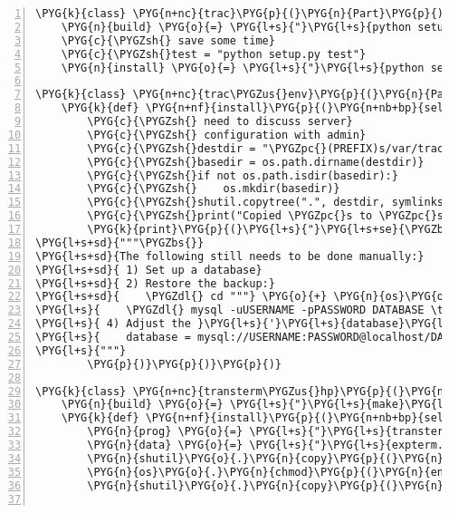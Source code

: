 \begin{Verbatim}[commandchars=\\\{\},numbers=left,firstnumber=1,stepnumber=5]
\PYG{k}{class} \PYG{n+nc}{trac}\PYG{p}{(}\PYG{n}{Part}\PYG{p}{)}\PYG{p}{:}
    \PYG{n}{build} \PYG{o}{=} \PYG{l+s}{"}\PYG{l+s}{python setup.py build}\PYG{l+s}{"}
    \PYG{c}{\PYGZsh{} save some time}
    \PYG{c}{\PYGZsh{}test = "python setup.py test"}
    \PYG{n}{install} \PYG{o}{=} \PYG{l+s}{"}\PYG{l+s}{python setup.py install --prefix=\PYGZdl{}PREFIX}\PYG{l+s}{"}

\PYG{k}{class} \PYG{n+nc}{trac\PYGZus{}env}\PYG{p}{(}\PYG{n}{Part}\PYG{p}{)}\PYG{p}{:}
    \PYG{k}{def} \PYG{n+nf}{install}\PYG{p}{(}\PYG{n+nb+bp}{self}\PYG{p}{)}\PYG{p}{:}
        \PYG{c}{\PYGZsh{} need to discuss server}
        \PYG{c}{\PYGZsh{} configuration with admin}
        \PYG{c}{\PYGZsh{}destdir = "\PYGZpc{}(PREFIX)s/var/trac\PYGZus{}env" \PYGZpc{} env}
        \PYG{c}{\PYGZsh{}basedir = os.path.dirname(destdir)}
        \PYG{c}{\PYGZsh{}if not os.path.isdir(basedir):}
        \PYG{c}{\PYGZsh{}    os.mkdir(basedir)}
        \PYG{c}{\PYGZsh{}shutil.copytree(".", destdir, symlinks=True)}
        \PYG{c}{\PYGZsh{}print("Copied \PYGZpc{}s to \PYGZpc{}s\PYGZbs{}n" \PYGZpc{} (os.getcwd(), destdir))}
        \PYG{k}{print}\PYG{p}{(}\PYG{l+s}{"}\PYG{l+s+se}{\PYGZbs{}n}\PYG{l+s}{"}\PYG{o}{.}\PYG{n}{join}\PYG{p}{(}\PYG{p}{(}
\PYG{l+s+sd}{"""\PYGZbs{}}
\PYG{l+s+sd}{The following still needs to be done manually:}
\PYG{l+s+sd}{ 1) Set up a database}
\PYG{l+s+sd}{ 2) Restore the backup:}
\PYG{l+s+sd}{    \PYGZdl{} cd """} \PYG{o}{+} \PYG{n}{os}\PYG{o}{.}\PYG{n}{getcwd}\PYG{p}{(}\PYG{p}{)} \PYG{o}{+} \PYG{l+s}{"""}
\PYG{l+s}{    \PYGZdl{} mysql -uUSERNAME -pPASSWORD DATABASE \textless{} mysql-db-backup.sql}
\PYG{l+s}{ 4) Adjust the }\PYG{l+s}{'}\PYG{l+s}{database}\PYG{l+s}{'}\PYG{l+s}{ variable in the [trac] section in }\PYG{l+s}{'}\PYG{l+s}{conf/trac.ini}\PYG{l+s}{'}\PYG{l+s}{:}
\PYG{l+s}{    database = mysql://USERNAME:PASSWORD@localhost/DATABSE}
\PYG{l+s}{"""}
        \PYG{p}{)}\PYG{p}{)}\PYG{p}{)}

\PYG{k}{class} \PYG{n+nc}{transterm\PYGZus{}hp}\PYG{p}{(}\PYG{n}{Part}\PYG{p}{)}\PYG{p}{:}
    \PYG{n}{build} \PYG{o}{=} \PYG{l+s}{"}\PYG{l+s}{make}\PYG{l+s}{"}
    \PYG{k}{def} \PYG{n+nf}{install}\PYG{p}{(}\PYG{n+nb+bp}{self}\PYG{p}{)}\PYG{p}{:}
        \PYG{n}{prog} \PYG{o}{=} \PYG{l+s}{"}\PYG{l+s}{transterm}\PYG{l+s}{"}
        \PYG{n}{data} \PYG{o}{=} \PYG{l+s}{"}\PYG{l+s}{expterm.dat}\PYG{l+s}{"}
        \PYG{n}{shutil}\PYG{o}{.}\PYG{n}{copy}\PYG{p}{(}\PYG{n}{prog}\PYG{p}{,} \PYG{n}{env}\PYG{p}{[}\PYG{l+s}{"}\PYG{l+s}{BINDIR}\PYG{l+s}{"}\PYG{p}{]}\PYG{p}{)}
        \PYG{n}{os}\PYG{o}{.}\PYG{n}{chmod}\PYG{p}{(}\PYG{n}{env}\PYG{p}{[}\PYG{l+s}{"}\PYG{l+s}{BINDIR}\PYG{l+s}{"}\PYG{p}{]} \PYG{o}{+} \PYG{l+s}{"}\PYG{l+s}{/}\PYG{l+s}{"} \PYG{o}{+} \PYG{n}{prog}\PYG{p}{,} \PYG{l+m+mo}{0775}\PYG{p}{)}
        \PYG{n}{shutil}\PYG{o}{.}\PYG{n}{copy}\PYG{p}{(}\PYG{n}{data}\PYG{p}{,} \PYG{n}{env}\PYG{p}{[}\PYG{l+s}{"}\PYG{l+s}{LIBDIR}\PYG{l+s}{"}\PYG{p}{]}\PYG{p}{)}


\end{Verbatim}
